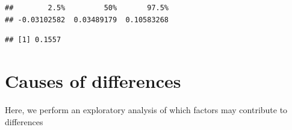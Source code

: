 \documentclass[
]{article}
\newenvironment{Shaded}{\begin{snugshade}}{\end{snugshade}}
\newcommand{\CommentTok}[1]{\textcolor[rgb]{0.56,0.35,0.01}{\textit{#1}}}
\newcommand{\DecValTok}[1]{\textcolor[rgb]{0.00,0.00,0.81}{#1}}
\newcommand{\FunctionTok}[1]{\textcolor[rgb]{0.00,0.00,0.00}{#1}}
\newcommand{\NormalTok}[1]{#1}
\newcommand{\SpecialCharTok}[1]{\textcolor[rgb]{0.00,0.00,0.00}{#1}}
\begin{document}
\begin{verbatim}
##        2.5%         50%       97.5% 
## -0.03102582  0.03489179  0.10583268
\end{verbatim}

\begin{Shaded}
\end{Shaded}

\begin{verbatim}
## [1] 0.1557
\end{verbatim}

\hypertarget{causes-of-differences}{%
\section{Causes of differences}\label{causes-of-differences}}

Here, we perform an exploratory analysis of which factors may contribute
to differences
\end{document}

